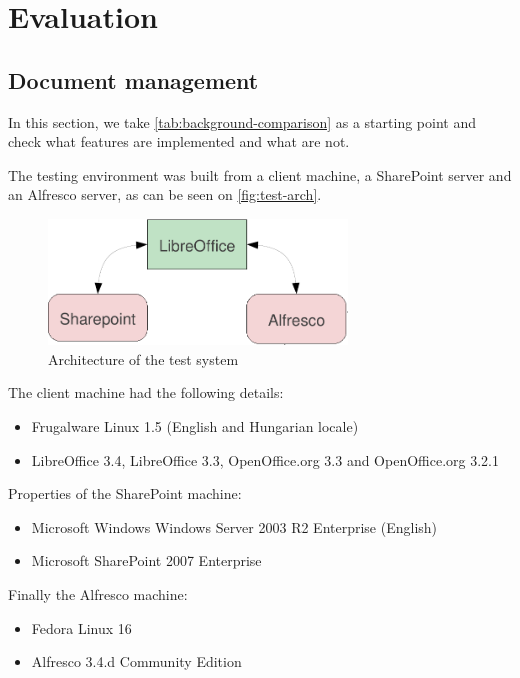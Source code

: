 \chapter{Evaluation}

\section{Document management}

In this section, we take \autoref{tab:background-comparison} as a starting
point and check what features are implemented and what are not.

The testing environment was built from a client machine, a SharePoint server
and an Alfresco server, as can be seen on \autoref{fig:test-arch}.

\begin{figure}[H]
\centering
\includegraphics[width=300px,keepaspectratio]{test-arch.pdf}
\caption{Architecture of the test system}
\label{fig:test-arch}
\end{figure}

The client machine had the following details:
\begin{itemize}
\item Frugalware Linux 1.5 (English and Hungarian locale)
\item LibreOffice 3.4, LibreOffice 3.3, OpenOffice.org 3.3 and OpenOffice.org 3.2.1
\end{itemize}

Properties of the SharePoint machine:

\begin{itemize}
\item Microsoft Windows Windows Server 2003 R2 Enterprise (English)
\item Microsoft SharePoint 2007 Enterprise
\end{itemize}

Finally the Alfresco machine:

\begin{itemize}
\item Fedora Linux 16
\item Alfresco 3.4.d Community Edition
\end{itemize}

